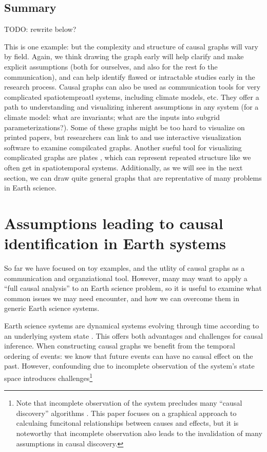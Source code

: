 \documentclass[12pt]{article}
\begin{document}
\subsection{Summary}

TODO: rewrite below?

This is one example: but the complexity and structure of causal graphs
will vary by field. Again, we think drawing the graph early will help
clarify and make explicit assumptions (both for ourselves, and also
for the rest fo the communication), and can help identify flawed or
intractable studies early in the research process. Causal graphs can
also be used as communication tools for very complicated
spatiotemproatl systems, including climate models, etc. They offer a
path to understanding and visualizing inherent assumptions in any
system (for a climate model: what are invariants; what are the inputs
into subgrid parameterizations?). Some of these graphs might be too
hard to visualize on printed papers, but researchers can link to and
use interactive visualization software to examine compilcated
graphs. Another sueful tool for visualizing complicated graphs are
plates \citep{bishop2006pattern}, which can represent repeated
structure like we often get in spatiotemporal systems. Additionally,
as we will see in the next section, we can draw quite general graphs
that are reprentative of many problems in Earth science.


\section{Assumptions leading to causal identification in Earth
  systems}
\label{sec:necess-cond-caus}

So far we have focused on toy examples, and the utlity of causal
graphs as a communication and organziational tool. However, many may
want to apply a ``full causal analysis'' to an Earth science problem,
so it is useful to examine what common issues we may need encounter,
and how we can overcome them in generic Earth science systems.

Earth science systems are dynamical systems evolving through time
according to an underlying system state
\citep{lorenz-1963,lorenz1996predictability,majda-state}. This offers
both advantages and challenges for causal inference. When constructing
causal graphs we benefit from the temporal ordering of events: we know
that future events can have no causal effect on the past. However,
confounding due to incomplete observation of the system's state space
introduces challenges\footnote{Note that incomplete observation of the
  system precludes many ``causal discovery'' algorithms \citep[see ][
  for a great review]{runge2019inferring}. This paper focuses on a
  graphical approach to calculaing funcitonal relationships between
  causes and effects, but it is noteworthy that incomplete observation
  also leads to the invalidation of many assumptions in causal
  discovery.}
\end{document}
